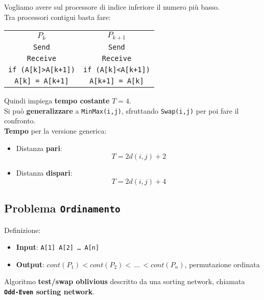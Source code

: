 Vogliamo avere sul processore di indice inferiore il numero più basso.\\

Tra processori contigui basta fare:
\begin{center}
	\begin{tabular}{c c}
		$P_k$ & $P_{k+1}$ \\
		\texttt{Send} & \texttt{Send} \\
		\texttt{Receive} & \texttt{Receive} \\
		\texttt{if (A[k]>A[k+1])} & \texttt{if (A[k]<A[k+1])} \\
		\texttt{A[k] = A[k+1]} & \texttt{A[k+1] = A[k]}
	\end{tabular}
\end{center}

Quindi impiega \textbf{tempo costante} $T = 4$.\\

Si può \textbf{generalizzare} a \texttt{MinMax(i,j)}, sfruttando \texttt{Swap(i,j)} per poi fare il confronto.\\

\textbf{Tempo} per la versione generica: 
\begin{itemize}
	\item Distanza \textbf{pari}: 
	$$ T = 2 d(i,j) + 2 $$
	\item Distanza \textbf{dispari}:
	$$ T = 2 d(i,j) + 4 $$
\end{itemize}


\newpage

\subsection{Problema \texttt{Ordinamento}}
\label{subsec:ordinamento}

Definizione:
\begin{itemize}
	\item \textbf{Input}: \texttt{A[1]  A[2] \dots  \; A[n]}
	\item \textbf{Output}: $cont(P_1) < cont(P_2) < \, \dots \, < cont(P_n)$, permutazione ordinata
\end{itemize} 

Algoritmo \textbf{test/swap oblivious} descritto da una sorting network, chiamata \textbf{\texttt{Odd-Even} sorting network}.\\

